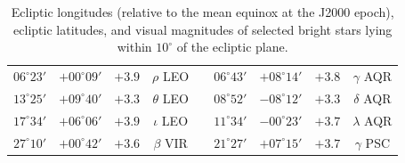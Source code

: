 \begin{table}[!h]
{\begin{tabular}{ccccccccc}
$06^\circ 23'$  & $+00^\circ 09'$ &  $+3.9$ &  $\rho$     LEO &&
$06^\circ 43'$  &$+08^\circ 14'$ &   $+3.8$ &  $\gamma$  AQR\\
$13^\circ 25'$  &$+09^\circ 40'$ &  $+3.3$ &  $\theta$   LEO &&
$08^\circ 52'$  &$-08^\circ 12'$ &  $+3.3$ &  $\delta$   AQR\\
$17^\circ 34'$ & $+06^\circ 06'$ &  $+3.9$ &  $\iota$    LEO &&
$11^\circ 34'$ &   $-00^\circ 23'$ &  $+3.7$ &  $\lambda$  AQR\\
$27^\circ 10'$ &  $+00^\circ 42'$ &  $+3.6$ &  $\beta$    VIR &&
$21^\circ 27'$ &  $+07^\circ 15'$ &  $+3.7$ &  $\gamma$   PSC\\
\end{tabular}}
\caption{Ecliptic longitudes (relative to the mean equinox at the J2000 epoch), ecliptic latitudes, and visual magnitudes of selected bright stars lying within $10^\circ$ of the ecliptic plane.}\label{tstar}
\end{table}

